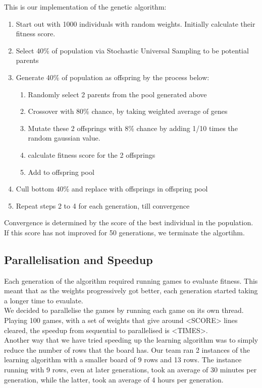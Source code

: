 \documentclass[a4paper,12pt,twocolumn]{article}
\begin{document}
This is our implementation of the genetic algorithm:
\begin{enumerate}
    \item Start out with 1000 individuals with random weights. Initially calculate
    their fitness score.
    \item Select 40\% of population via Stochastic Universal Sampling to be
            potential parents
    \item Generate 40\% of population as offspring by the process below:
        \begin{enumerate}
            \item Randomly select 2 parents from the pool generated above
            \item Crossover with 80\% chance, by taking weighted average of genes
            \item Mutate these 2 offsprings with 8\% chance by adding 1/10 times
                the random gaussian value.
            \item calculate fitness score for the 2 offsprings
            \item Add to offspring pool
        \end{enumerate}
    \item Cull bottom 40\% and replace with offsprings in offspring pool
    \item Repeat steps 2 to 4 for each generation, till convergence
\end{enumerate}

Convergence is determined by the score of the best individual in the population.
If this score has not improved for 50 generations, we terminate the algortihm.

\subsection{Parallelisation and Speedup}
Each generation of the algorithm required running games to evaluate fitness. This
meant that as the weights progressively got better, each generation started
taking a longer time to evaulate.\\

We decided to parallelise the games by running each game on its own thread. Playing
100 games, with a set of weights that give around <SCORE> lines cleared, the
speedup from sequential to parallelised is <TIMES>.\\

Another way that we have tried speeding up the learning algorithm was to simply
reduce the number of rows that the board has. Our team ran 2 instances of the
learning algorithm with a smaller board of 9 rows and 13 rows. The instance
running with 9 rows, even at later generations, took an average of 30 minutes per
generation, while the latter, took an average of 4 hours per generation.
\end{document}
